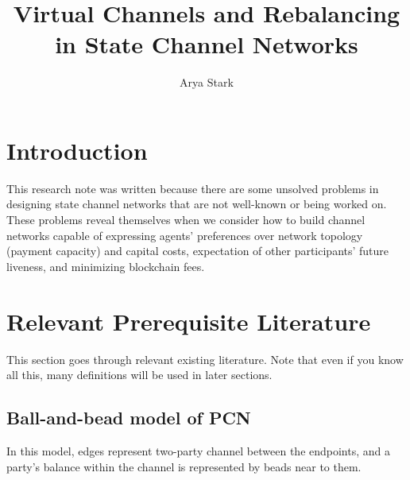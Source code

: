 \documentclass{article}
\author{Arya Stark}
\title{Virtual Channels and Rebalancing in State Channel Networks}
\date{}
\begin{document}
\maketitle

\section*{Introduction}

This research note was written because there are some unsolved problems in designing state channel networks that are not well-known or being worked on. These problems reveal themselves when we consider how to build channel networks capable of expressing agents' preferences over network topology (payment capacity) and capital costs, expectation of other participants' future liveness, and minimizing blockchain fees.

\section*{Relevant Prerequisite Literature}

This section goes through relevant existing literature. Note that even if you know all this, many definitions will be used in later sections.

\subsection*{Ball-and-bead model of PCN}

In this model, edges represent two-party channel between the endpoints, and a party's balance within the channel is represented by beads near to them.
\end{document}

